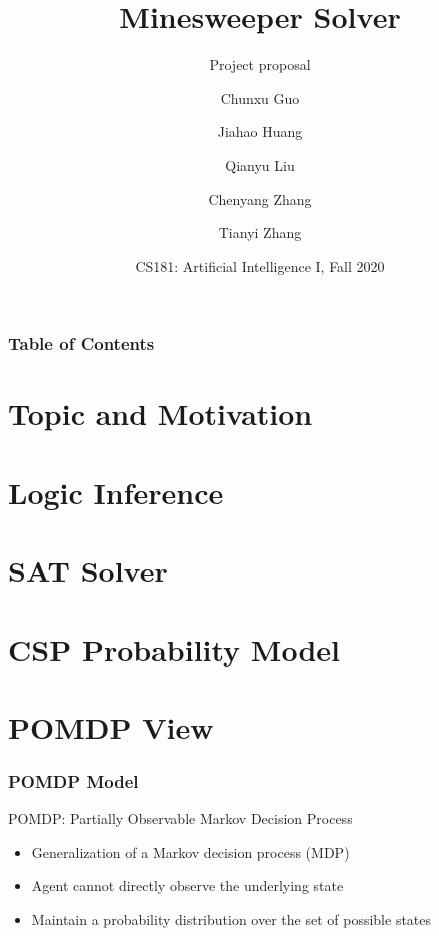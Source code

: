 \documentclass[aspectratio=169]{beamer}
\title[Minesweeper Solver] %
{Minesweeper Solver}
\subtitle{Project proposal}
\author[Team 4] %
{Chunxu Guo \and Jiahao Huang \and Qianyu Liu\\ \and Chenyang Zhang \and Tianyi Zhang}
\institute[ShanghaiTech] %
{
  ShanghaiTech University
}
\date[Dec. 14] %
{CS181: Artificial Intelligence I, Fall 2020}
\begin{document}
\frame{\titlepage}


\begin{frame}
\frametitle{Table of Contents}
\tableofcontents
\end{frame}


\section{Topic and Motivation}






\section{Logic Inference}






\section{SAT Solver}






\section{CSP Probability Model}






\section{POMDP View}

\begin{frame}
	\frametitle{POMDP Model}
	POMDP: Partially Observable Markov Decision Process
	\begin{itemize}
	    \item Generalization of a Markov decision process (MDP)
	    \item Agent cannot directly observe the underlying state
	    \item Maintain a probability distribution over the set of possible states
	\end{itemize}
\end{frame}
\end{document}

